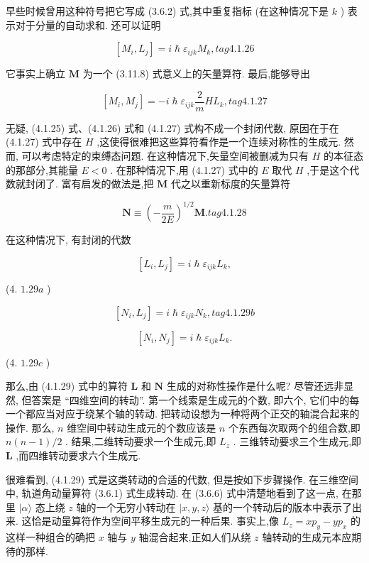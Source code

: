 早些时候曾用这种符号把它写成 (3.6.2) 式,其中重复指标 (在这种情况下是 $k$ ) 表示对于分量的自动求和. 还可以证明

$$
\left\lbrack {{M}_{i},{L}_{j}}\right\rbrack = i\hslash {\varepsilon }_{ijk}{M}_{k}, tag{4. 1.26}
$$

它事实上确立 $\mathbf{M}$ 为一个 (3.11.8) 式意义上的矢量算符. 最后,能够导出

$$
\left\lbrack {{M}_{i},{M}_{j}}\right\rbrack = - i\hslash {\varepsilon }_{ijk}\frac{2}{m}H{L}_{k}, tag{4. 1.27}
$$

无疑, (4.1.25) 式、(4.1.26) 式和 (4.1.27) 式构不成一个封闭代数, 原因在于在 (4.1.27) 式中存在 $H$ ,这使得很难把这些算符看作是一个连续对称性的生成元. 然而, 可以考虑特定的束缚态问题. 在这种情况下,矢量空间被删减为只有 $H$ 的本征态的那部分,其能量 $E < 0$ . 在那种情况下,用 (4.1.27) 式中的 $E$ 取代 $H$ ,于是这个代数就封闭了. 富有启发的做法是,把 $\mathbf{M}$ 代之以重新标度的矢量算符

$$
\mathbf{N} \equiv {\left( -\frac{m}{2E}\right) }^{1/2}\mathbf{M}. tag{4. 1.28}
$$

在这种情况下, 有封闭的代数

$$
\left\lbrack {{L}_{i},{L}_{j}}\right\rbrack = i\hslash {\varepsilon }_{ijk}{L}_{k},
$$

(4. ${1.29a}$ )

$$
\left\lbrack {{N}_{i},{L}_{j}}\right\rbrack = i\hslash {\varepsilon }_{ijk}{N}_{k}, tag{4.1.29b}
$$

$$
\left\lbrack {{N}_{i},{N}_{j}}\right\rbrack = i\hslash {\varepsilon }_{ijk}{L}_{k}.
$$

(4. ${1.29c}$ )

那么,由 (4.1.29) 式中的算符 $\mathbf{L}$ 和 $\mathbf{N}$ 生成的对称性操作是什么呢? 尽管还远非显然, 但答案是 “四维空间的转动”. 第一个线索是生成元的个数, 即六个, 它们中的每一个都应当对应于绕某个轴的转动. 把转动设想为一种将两个正交的轴混合起来的操作. 那么, $n$ 维空间中转动生成元的个数应该是 $n$ 个东西每次取两个的组合数,即 $n\left( {n - 1}\right) /2$ . 结果,二维转动要求一个生成元,即 ${L}_{z}$ . 三维转动要求三个生成元,即 $\mathbf{L}$ ,而四维转动要求六个生成元.

很难看到, (4.1.29) 式是这类转动的合适的代数, 但是按如下步骤操作. 在三维空间中, 轨道角动量算符 (3.6.1) 式生成转动. 在 (3.6.6) 式中清楚地看到了这一点, 在那里 $|\alpha \rangle$ 态上绕 $z$ 轴的一个无穷小转动在 $|x, y, z\rangle$ 基的一个转动后的版本中表示了出来. 这恰是动量算符作为空间平移生成元的一种后果. 事实上,像 ${L}_{z} = x{p}_{y} - y{p}_{x}$ 的这样一种组合的确把 $x$ 轴与 $y$ 轴混合起来,正如人们从绕 $z$ 轴转动的生成元本应期待的那样.

